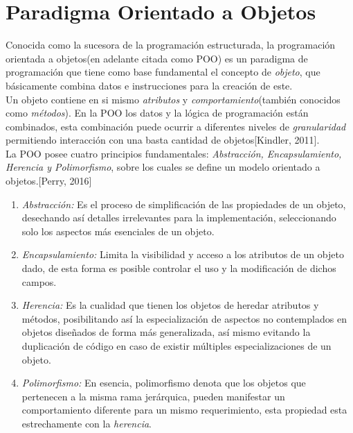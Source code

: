 \section {Paradigma Orientado a Objetos}
\noindent Conocida como la sucesora de la programación estructurada, la programación orientada a objetos(en adelante citada como POO)
\noindent es un paradigma de programación que tiene como base fundamental el concepto de \textit{objeto}, que básicamente combina datos
\noindent e instrucciones para la creación de este.\\
\noindent Un objeto contiene en si mismo \textit{atributos} y \textit{comportamiento}(también conocidos como \textit{métodos}).
\noindent En la POO los datos y la lógica de programación están combinados, esta combinación puede ocurrir a diferentes niveles de
\noindent \textit{granularidad} permitiendo interacción con una basta cantidad de objetos[Kindler, 2011].\\
\noindent La POO posee cuatro principios fundamentales: \textit{Abstracción, Encapsulamiento, Herencia y Polimorfismo},
\noindent sobre los cuales se define un modelo orientado a objetos.[Perry, 2016]\\
\begin{enumerate}
    \item \textit{Abstracción:} Es el proceso de  simplificación de las propiedades de un objeto,
          \noindent desechando así detalles irrelevantes para la implementación, seleccionando solo los aspectos
          \noindent más esenciales de un objeto.
    \item \textit{Encapsulamiento:} Limita la visibilidad y acceso a los atributos de un objeto dado, de esta forma
          \nonident es posible controlar el uso y la modificación de dichos campos.
    \item \textit{Herencia:} Es la cualidad que tienen los objetos de heredar atributos y métodos, posibilitando así la especialización
          \nonindent de aspectos no contemplados en objetos diseñados de forma más generalizada, así mismo evitando la duplicación
          \nonindent de código en caso de existir múltiples especializaciones de un objeto.
    \item \textit{Polimorfismo:} En esencia, polimorfismo denota que los objetos que pertenecen a la misma rama jerárquica,
          \nonindent pueden manifestar un comportamiento diferente para un mismo requerimiento, esta propiedad esta estrechamente
          \nonindent con la \textit{herencia}.
\end{enumerate}
